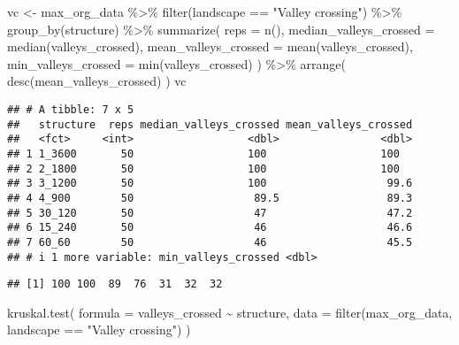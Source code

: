 \documentclass[
]{book}
\newenvironment{Shaded}{\begin{snugshade}}{\end{snugshade}}
\newcommand{\AttributeTok}[1]{\textcolor[rgb]{0.77,0.63,0.00}{#1}}
\newcommand{\FunctionTok}[1]{\textcolor[rgb]{0.00,0.00,0.00}{#1}}
\newcommand{\NormalTok}[1]{#1}
\newcommand{\OtherTok}[1]{\textcolor[rgb]{0.56,0.35,0.01}{#1}}
\newcommand{\SpecialCharTok}[1]{\textcolor[rgb]{0.00,0.00,0.00}{#1}}
\newcommand{\StringTok}[1]{\textcolor[rgb]{0.31,0.60,0.02}{#1}}
\begin{document}
\begin{Shaded}
\begin{Highlighting}[]
\NormalTok{vc }\OtherTok{\textless{}{-}}\NormalTok{ max\_org\_data }\SpecialCharTok{\%\textgreater{}\%}
  \FunctionTok{filter}\NormalTok{(landscape }\SpecialCharTok{==} \StringTok{"Valley crossing"}\NormalTok{) }\SpecialCharTok{\%\textgreater{}\%}
  \FunctionTok{group\_by}\NormalTok{(structure) }\SpecialCharTok{\%\textgreater{}\%}
  \FunctionTok{summarize}\NormalTok{(}
    \AttributeTok{reps =} \FunctionTok{n}\NormalTok{(),}
    \AttributeTok{median\_valleys\_crossed =} \FunctionTok{median}\NormalTok{(valleys\_crossed),}
    \AttributeTok{mean\_valleys\_crossed =} \FunctionTok{mean}\NormalTok{(valleys\_crossed),}
    \AttributeTok{min\_valleys\_crossed =} \FunctionTok{min}\NormalTok{(valleys\_crossed)}
\NormalTok{  ) }\SpecialCharTok{\%\textgreater{}\%}
  \FunctionTok{arrange}\NormalTok{(}
    \FunctionTok{desc}\NormalTok{(mean\_valleys\_crossed)}
\NormalTok{  )}
\NormalTok{vc}
\end{Highlighting}
\end{Shaded}

\begin{verbatim}
## # A tibble: 7 x 5
##   structure  reps median_valleys_crossed mean_valleys_crossed
##   <fct>     <int>                  <dbl>                <dbl>
## 1 1_3600       50                  100                  100  
## 2 2_1800       50                  100                  100  
## 3 3_1200       50                  100                   99.6
## 4 4_900        50                   89.5                 89.3
## 5 30_120       50                   47                   47.2
## 6 15_240       50                   46                   46.6
## 7 60_60        50                   46                   45.5
## # i 1 more variable: min_valleys_crossed <dbl>
\end{verbatim}

\begin{Shaded}
\end{Shaded}

\begin{verbatim}
## [1] 100 100  89  76  31  32  32
\end{verbatim}

\begin{Shaded}
\begin{Highlighting}[]
\FunctionTok{kruskal.test}\NormalTok{(}
  \AttributeTok{formula =}\NormalTok{ valleys\_crossed }\SpecialCharTok{\textasciitilde{}}\NormalTok{ structure,}
  \AttributeTok{data =} \FunctionTok{filter}\NormalTok{(max\_org\_data, landscape }\SpecialCharTok{==} \StringTok{"Valley crossing"}\NormalTok{)}
\NormalTok{)}
\end{Highlighting}
\end{Shaded}
\end{document}
